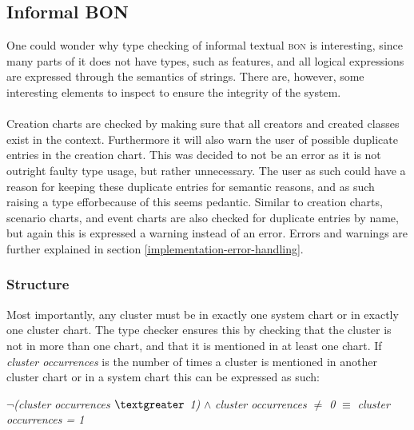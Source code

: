 \subsection{Informal BON}
One could wonder why type checking of informal textual \textsc{bon} is interesting, since many parts of it does not have types, such as features, and all logical expressions are expressed through the semantics of strings. There are, however, some interesting elements to inspect to ensure the integrity of the system.

\paragraph{}
Creation charts are checked by making sure that all creators and created classes exist in the context. Furthermore it will also warn the user of possible duplicate entries in the creation chart. This was decided to not be an error as it is not outright faulty type usage, but rather unnecessary. The user as such could have a reason for keeping these duplicate entries for semantic reasons, and as such raising a type efforbecause of this seems pedantic. Similar to creation charts, scenario charts, and event charts are also checked for duplicate entries by name, but again this is expressed a warning instead of an error. Errors and warnings are further explained in section \ref{implementation-error-handling}.

\subsubsection{Structure}
\label{implementation-informal-structure}
Most importantly, any cluster must be in exactly one system chart or in exactly one cluster chart. The type checker ensures this by checking that the cluster is not in more than one chart, and that it is mentioned in at least one chart. If \textit{cluster occurrences} is the number of times a cluster is mentioned in another cluster chart or in a system chart this can be expressed as such: 
{\footnotesize\begin{center} $\neg$\textit{(cluster occurrences $\textgreater$ 1)} $\wedge$ \textit{cluster occurrences $\neq$ 0} \textit{} $\equiv$  \textit{cluster occurrences = 1}
\end{center}}
